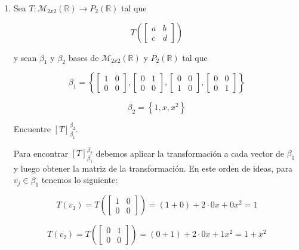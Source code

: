 \documentclass{report}
\begin{document}
\begin{enumerate}
        \item Sea $T: \mathcal{M}_{2x2}(\mathbb{R}) \to P_2(\mathbb{R})$ tal que

        $$T\left(\begin{bmatrix}
            a & b \\
            c & d
        \end{bmatrix}\right)$$

        y sean $\beta_1$ y $\beta_2$ bases de $\mathcal{M}_{2x2}(\mathbb{R})$ y $P_2(\mathbb{R})$ tal que

        $$\beta_1 = \left\{
            \begin{bmatrix}
                1 & 0 \\
                0 & 0
            \end{bmatrix},
            \begin{bmatrix}
                0 & 1 \\
                0 & 0
            \end{bmatrix},
            \begin{bmatrix}
                0 & 0 \\
                1 & 0
            \end{bmatrix},
            \begin{bmatrix}
                0 & 0 \\
                0 & 1
            \end{bmatrix}
        \right\}$$

        $$\beta_2 = \left\{1, x, x^2\right\}$$

        Encuentre $[T]_{\beta_1}^{\beta_2}$.

        Para encontrar $[T]_{\beta_1}^{\beta_2}$ debemos aplicar la transformación a cada vector de $\beta_1$ y luego obtener la matriz de la transformación. En este orden de ideas, para $v_j \in \beta_1$ tenemos lo siguiente:

        $$T(v_1) = T \left(\begin{bmatrix}
            1 & 0 \\
            0 & 0
        \end{bmatrix}\right) = (1 + 0) + 2\cdot 0x + 0x^2 = 1$$

        $$T(v_2) = T \left(\begin{bmatrix}
            0 & 1 \\
            0 & 0
        \end{bmatrix}\right) = (0 + 1) + 2\cdot 0x + 1x^2 = 1 + x^2$$


\end{enumerate}
\end{document}
